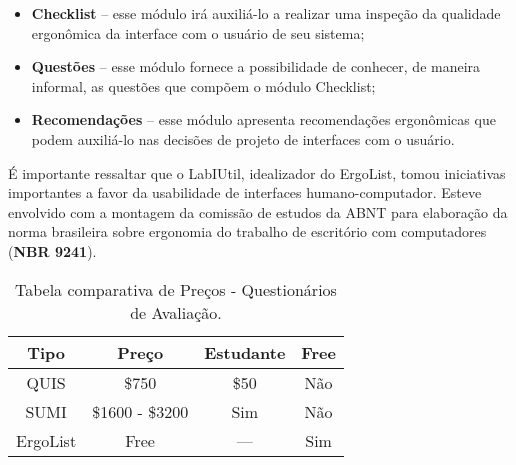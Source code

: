 		\begin{itemize}
			\item{\textbf{Checklist} – esse módulo irá auxiliá-lo a realizar uma inspeção da qualidade ergonômica da interface com o usuário de seu sistema;}
			\item{\textbf{Questões} – esse módulo fornece a possibilidade de conhecer, de maneira informal, as questões que compõem o módulo Checklist;}
			\item{\textbf{Recomendações} – esse módulo apresenta recomendações ergonômicas que podem auxiliá-lo nas decisões de projeto de interfaces com o usuário.}
		\end{itemize}

		É importante ressaltar que o LabIUtil, idealizador do ErgoList, tomou iniciativas importantes a favor da usabilidade de interfaces humano-computador. Esteve envolvido com a montagem da comissão de estudos da ABNT para elaboração da norma brasileira sobre ergonomia do trabalho de escritório com computadores (\textbf{NBR 9241}).

		\label{subsubsec:questionarios_tables}
		\begin{table}[h]
			\centering 
			\begin{tabular}{|c|c|c|c|}

				\hline

				Tipo & Preço & Estudante\footnotemark[1] & Free \\
				
				\hline
				
				QUIS & \$750 & \$50 & Não \\
				
				SUMI & \$1600 - \$3200 & Sim & Não \\
				
				ErgoList & Free & --- & Sim  \\

				\hline

			\end{tabular}
			\caption[Tabela comparativa de Preços - Questionários de Avaliação]{Tabela comparativa de Preços - Questionários de Avaliação.}
			\label{tab:questionarios._tabl}
		\end{table}




		

		

